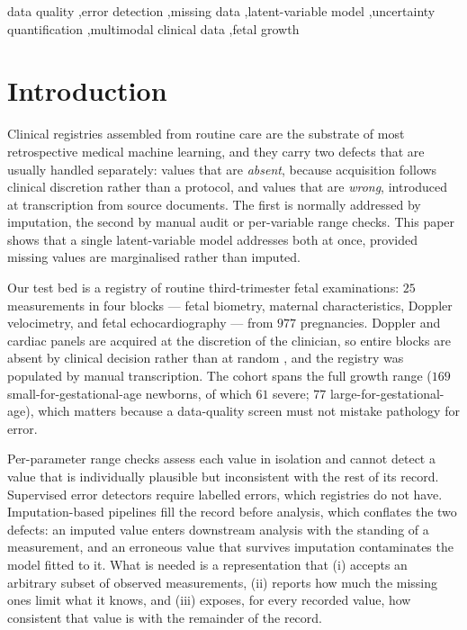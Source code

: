 \documentclass[a4paper,fleqn]{cas-sc}
\begin{document}
\begin{keywords}
data quality \sep error detection \sep missing data \sep latent-variable model \sep uncertainty quantification \sep multimodal clinical data \sep fetal growth
\end{keywords}

\maketitle



\section{Introduction}
Clinical registries assembled from routine care are the substrate of most retrospective medical machine learning, and they carry two defects that are usually handled separately: values that are \emph{absent}, because acquisition follows clinical discretion rather than a protocol, and values that are \emph{wrong}, introduced at transcription from source documents. The first is normally addressed by imputation, the second by manual audit or per-variable range checks. This paper shows that a single latent-variable model addresses both at once, provided missing values are marginalised rather than imputed.

Our test bed is a registry of routine third-trimester fetal examinations: $25$ measurements in four blocks --- fetal biometry, maternal characteristics, Doppler velocimetry, and fetal echocardiography --- from $977$ pregnancies. Doppler and cardiac panels are acquired at the discretion of the clinician, so entire blocks are absent by clinical decision rather than at random \cite{ref:littlerubin}, and the registry was populated by manual transcription. The cohort spans the full growth range ($169$ small-for-gestational-age newborns, of which $61$ severe; $77$ large-for-gestational-age), which matters because a data-quality screen must not mistake pathology for error.

Per-parameter range checks assess each value in isolation and cannot detect a value that is individually plausible but inconsistent with the rest of its record. Supervised error detectors require labelled errors, which registries do not have. Imputation-based pipelines fill the record before analysis, which conflates the two defects: an imputed value enters downstream analysis with the standing of a measurement, and an erroneous value that survives imputation contaminates the model fitted to it. What is needed is a representation that (i) accepts an arbitrary subset of observed measurements, (ii) reports how much the missing ones limit what it knows, and (iii) exposes, for every recorded value, how consistent that value is with the remainder of the record.
\end{document}
